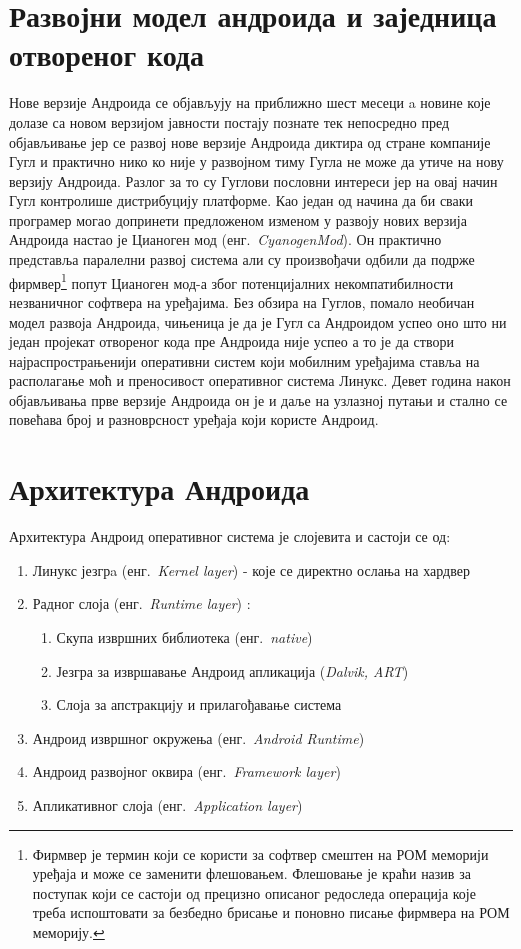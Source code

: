 \documentclass[12pt,oneside]{memoir}
\theoremstyle{remark}
\begin{document}
\section{Развојни модел андроида и заједница отвореног кода}
Нове верзије Андроида се објављују на приближно шест месеци a новине које долазе са новом верзијом јавности постају познате тек непосредно пред објављивање јер се развој нове верзије Андроида диктира од стране компаније Гугл и практично нико ко није у развојном тиму Гугла не може да утиче на нову верзију Андроида. Разлог за то су Гуглови пословни интереси јер на овај начин Гугл контролише дистрибуцију платформе. Као један од начина да би сваки програмер могао допринети предложеном изменом у развоју нових верзија Андроида настао је Цианоген мод  (енг.~{\em CyanogenMod}). Он практично представља паралелни развој система али су произвођачи одбили да подрже фирмвер\footnote{Фирмвер је термин који се користи за софтвер смештен на РОМ меморији уређаја и може се заменити флешовањем. Флешовање је краћи назив за поступак који се састоји од прецизно описаног редоследа операција које треба испоштовати за безбедно брисање и поновно писање фирмвера на РОМ меморију.} попут Цианоген мод-а због потенцијалних некомпатибилности незваничног софтвера на уређајима.  Без обзира на Гуглов, помало необичан модел развоја Андроида, чињеница је да је Гугл са Андроидом успео оно што ни један пројекат отвореног кода пре Андроида није успео а то је да створи најраспрострањенији оперативни систем који мобилним уређајима  ставља на располагање моћ и преносивост оперативног система Линукс. Девет година након објављивања прве верзије Андроида он је и даље на узлазној путањи и стално се повећава број и разноврсност уређаја који користе Андроид. 


\section{Архитектура Андроида}
Архитектура Андроид оперативног система је слојевита и састоји се од:
\begin{enumerate}
\item Линукс језгрa (енг.~{\em Kernel layer}) - које се директно ослања на хардвер
\item Радног слоја (енг.~{\em Runtime layer}) :
\begin{enumerate}
\item Скупа извршних библиотека  (енг.~{\em native})
\item Језгра за извршавање Андроид апликација  ({\em Dalvik, ART})
\item Слоја за апстракцију и прилагођавање система
\end{enumerate}

\item Андроид извршног окружења (енг.~{\em Android Runtime})
\item Андроид развојног оквира (енг.~{\em Framework layer}) 
\item Апликативног слоја (енг.~{\em Application layer})
\end{enumerate}
\end{document}
